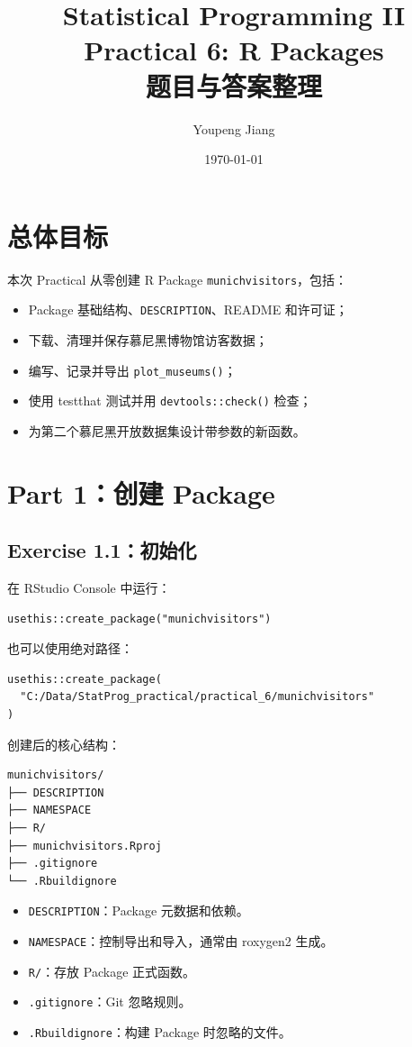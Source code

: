 \documentclass[11pt,a4paper]{ctexart}
\title{\textbf{Statistical Programming II}\\Practical 6: R Packages\\题目与答案整理}
\author{Youpeng Jiang}
\date{\today}
\begin{document}
\maketitle
\tableofcontents
\newpage

\section{总体目标}

本次 Practical 从零创建 R Package \texttt{munichvisitors}，包括：

\begin{itemize}
  \item Package 基础结构、\texttt{DESCRIPTION}、README 和许可证；
  \item 下载、清理并保存慕尼黑博物馆访客数据；
  \item 编写、记录并导出 \texttt{plot\_museums()}；
  \item 使用 testthat 测试并用 \texttt{devtools::check()} 检查；
  \item 为第二个慕尼黑开放数据集设计带参数的新函数。
\end{itemize}

\section{Part 1：创建 Package}

\subsection{Exercise 1.1：初始化}

在 RStudio Console 中运行：

\begin{lstlisting}
usethis::create_package("munichvisitors")
\end{lstlisting}

也可以使用绝对路径：

\begin{lstlisting}
usethis::create_package(
  "C:/Data/StatProg_practical/practical_6/munichvisitors"
)
\end{lstlisting}

创建后的核心结构：

\begin{verbatim}
munichvisitors/
├── DESCRIPTION
├── NAMESPACE
├── R/
├── munichvisitors.Rproj
├── .gitignore
└── .Rbuildignore
\end{verbatim}

\begin{itemize}
  \item \texttt{DESCRIPTION}：Package 元数据和依赖。
  \item \texttt{NAMESPACE}：控制导出和导入，通常由 roxygen2 生成。
  \item \texttt{R/}：存放 Package 正式函数。
  \item \texttt{.gitignore}：Git 忽略规则。
  \item \texttt{.Rbuildignore}：构建 Package 时忽略的文件。
\end{itemize}
\end{document}

